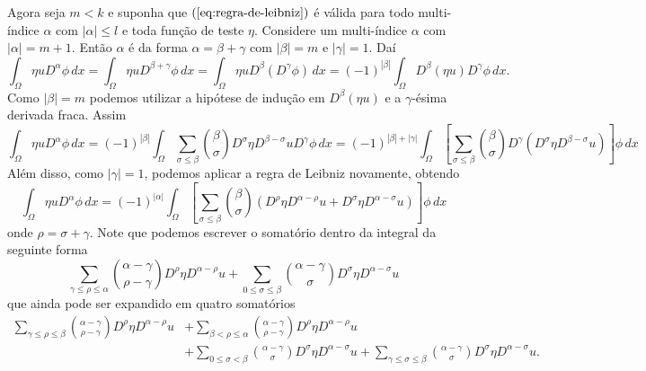 \documentclass[a4paper, 11pt]{book}
\theoremstyle{definition}
\begin{document}
\begin{prf}
    Agora seja $m < k$ e suponha que $(\ref{eq:regra-de-leibniz})$ é válida para todo multi-índice $\alpha$ com $|\alpha| \leqslant l$ e toda função de teste $\eta$.
    Considere um multi-índice $\alpha$ com $|\alpha| = m + 1$.
    Então $\alpha$ é da forma $\alpha = \beta + \gamma$ com $|\beta| = m$ e $|\gamma| = 1$. 
    Daí 
    \[
        \int_\Omega \eta u D^{\alpha}\phi \, dx = \int_\Omega \eta u D^{\beta + \gamma}\phi \, dx = \int_\Omega \eta u D^\beta(D^\gamma \phi) \, dx = (-1)^{|\beta|} \int_\Omega D^{\beta} (\eta u) D^{\gamma}\phi \,dx.
    \]
    Como $|\beta| = m$ podemos utilizar a hipótese de indução em $D^{\beta}(\eta u)$ e a $\gamma$-ésima derivada fraca. Assim
    {\small
    \[
        \int_\Omega \eta u D^{\alpha}\phi \, dx = (-1)^{|\beta|} \int_\Omega \sum_{\sigma \leqslant \beta} \binom{\beta}{\sigma} D^{\sigma} \eta D^{\beta - \sigma} u D^{\gamma}\phi \, dx = (-1)^{|\beta| + |\gamma|} \int_\Omega \left[\sum_{\sigma \leqslant \beta} \binom{\beta}{\sigma} D^{\gamma}(D^{\sigma} \eta D^{\beta - \sigma} u)\right] \phi \, dx
    \]}
    Além disso, como $|\gamma| = 1$, podemos aplicar a regra de Leibniz novamente, obtendo
    \begin{equation} \label{eq:integral-etau}
        \int_\Omega \eta u D^{\alpha}\phi \, dx = (-1)^{|\alpha|} \int_\Omega \left[\sum_{\sigma \leqslant \beta} \binom{\beta}{\sigma} \left(D^{\rho}\eta D^{\alpha - \rho} u + D^{\sigma} \eta D^{\alpha - \sigma} u\right)\right] \phi \,dx
    \end{equation}
    onde $\rho = \sigma + \gamma$. 
    Note que podemos escrever o somatório dentro da integral da seguinte forma
    \begin{equation*} \label{eq:somatorio}
        \sum_{\gamma \leqslant \rho \leqslant \alpha} \binom{\alpha - \gamma}{\rho - \gamma} D^{\rho}\eta D^{\alpha - \rho} u + \sum_{0 \leqslant\sigma \leqslant \beta} \binom{\alpha - \gamma}{\sigma} D^{\sigma} \eta D^{\alpha - \sigma} u
    \end{equation*}
    que ainda pode ser expandido em quatro somatórios
    \begin{equation} \label{eq:somatorio-2}
        \begin{aligned}
            \sum_{\gamma \leqslant \rho \leqslant \beta} \binom{\alpha - \gamma}{\rho - \gamma} D^{\rho}\eta D^{\alpha - \rho} u &+ \sum_{\beta < \rho \leqslant \alpha} \binom{\alpha - \gamma}{\rho - \gamma} D^{\rho}\eta D^{\alpha - \rho} u \\
            &+ \sum_{0 \leqslant \sigma < \beta} \binom{\alpha - \gamma}{\sigma} D^{\sigma} \eta D^{\alpha - \sigma} u + \sum_{\gamma \leqslant \sigma \leqslant \beta} \binom{\alpha - \gamma}{\sigma} D^{\sigma} \eta D^{\alpha - \sigma} u.

\end{aligned}
\end{equation}
\end{prf}
\end{document}
